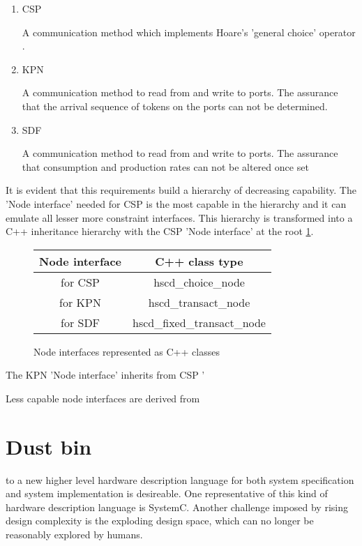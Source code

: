 \begin{enumerate}
\item CSP

A communication method which implements Hoare's 'general choice' operator \cite{csphoare:1985}.

\item KPN

A communication method to read from and write to ports.
The assurance that the arrival sequence of tokens on
the ports can not be determined.

\item SDF

A communication method to read from and write to ports.
The assurance that consumption and production rates can not
be altered once set

\end{enumerate}

It is evident that this requirements build a hierarchy of decreasing
capability. The 'Node interface' needed for CSP is the most capable
in the hierarchy and it can emulate all lesser more constraint interfaces.
This hierarchy is transformed into a C++ inheritance hierarchy with the
CSP 'Node interface' at the root \ref{node-interface-c++}.

\begin{figure}
\centering
\begin{tabular}{|c|c|}
\hline
 Node interface & C++ class type \\
\hline \hline
 for CSP & hscd\_choice\_node \\
 for KPN & hscd\_transact\_node \\
 for SDF & hscd\_fixed\_transact\_node \\
\hline
\end{tabular}
\caption{\label{node-interface-c++}Node interfaces represented as C++ classes}
\end{figure}

The KPN 'Node interface' inherits from
CSP '

Less capable node interfaces are
derived from 





\clearpage
\section{Dust bin}


to a new higher level hardware description
language for both system specification and system implementation is
desireable. One representative of this kind of hardware description
language is SystemC. Another challenge imposed by rising design complexity
is the exploding design space, which can no longer be reasonably explored
by humans.


